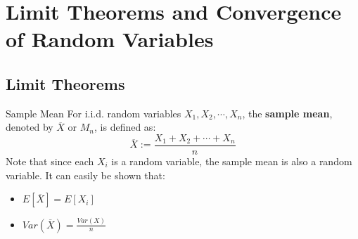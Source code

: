 \section{Limit Theorems and Convergence of Random Variables}
\subsection{Limit Theorems}
\begin{defn}{Sample Mean}{}
For i.i.d. random variables \(X_1, X_2, \cdots, X_n\), the \textbf{sample mean}, denoted by \(\overline{X}\) or \(M_n\), is defined as:
\begin{equation*}
  \overline{X} := \frac{X_1 + X_2 + \cdots + X_n}{n}
\end{equation*}
Note that since each \(X_i\) is a random variable, the sample mean is also a random variable. It can easily be shown that:
\begin{itemize}
  \item \(E[\overline{X}] = E[X_i]\)
  \item \(Var(\overline{X}) = \frac{Var(X)}{n}\)
\end{itemize}

\end{defn}

